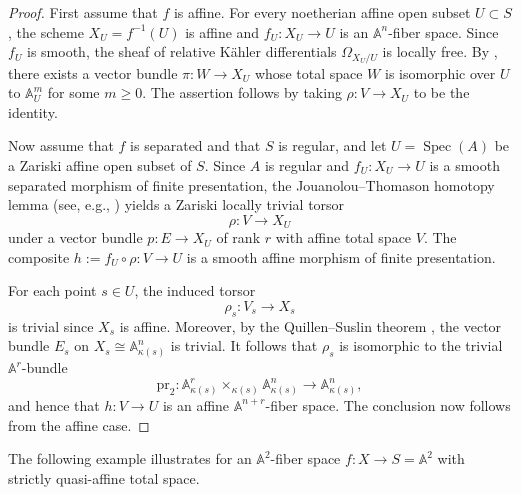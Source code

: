 \documentclass[10pt]{amsart}
\renewcommand{\AA}{\mathbb{A}}
\newcommand{\Spec}{\operatorname{Spec}}
\numberwithin{equation}{section} %
\theoremstyle{plain}
\theoremstyle{definition}
\theoremstyle{remark}
\begin{document}
\begin{proof}
First assume that $f$ is affine. For every noetherian affine open subset $U\subset S$, the scheme $X_U=f^{-1}(U)$ is affine and $f_U:X_U\to U$ is an $\AA^n$-fiber space. Since $f_U$ is smooth, the sheaf of relative Kähler differentials $\Omega_{X_U/U}$ is locally free. By \cite[Theorem 4.5]{asanuma82}, there exists a vector bundle $\pi:W\to X_U$ whose total space $W$ is isomorphic over $U$ to $\AA^m_U$ for some $m\geq 0$. The assertion follows by taking $\rho:V\to X_U$ to be the identity.
\medskip

Now assume that $f$ is separated and that $S$ is regular, and let $U=\Spec(A)$ be a Zariski affine open subset of $S$. Since $A$ is regular and $f_U:X_U\to U$ is a smooth separated morphism of finite presentation, the Jouanolou--Thomason homotopy lemma (see, e.g., \cite[Lemma~3.1.4]{asok2021A1}) yields a Zariski locally trivial torsor
\[
\rho:V\to X_U
\]
under a vector bundle $p:E\to X_U$ of rank $r$ with affine total space $V$. The composite $h:=f_U\circ \rho:V\to U$ is a smooth affine morphism of finite presentation.
\medskip

For each point $s\in U$, the induced torsor
\[
\rho_s:V_s\to X_s
\]
is trivial since $X_s$ is affine. Moreover, by the Quillen--Suslin theorem 
\cite{Qui76, zbMATH03822002}, the vector bundle $E_s$ on $X_s\cong \AA^n_{\kappa(s)}$ is trivial. 
It follows that $\rho_s$ is isomorphic to the trivial $\AA^r$-bundle
\[
\mathrm{pr}_2:\AA^r_{\kappa(s)}\times_{\kappa(s)}\AA^n_{\kappa(s)}\to \AA^n_{\kappa(s)},
\]
and hence that $h:V\to U$ is an affine $\AA^{n+r}$-fiber space. The conclusion now follows from the affine case.
\end{proof}

The following example illustrates  for an $\AA^2$-fiber space $f:X\to S=\AA^2$ with strictly quasi-affine total space.
\end{document}
